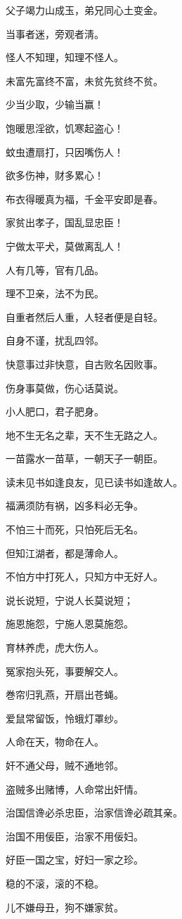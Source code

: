 \documentclass[12pt,oneside]{book}
\begin{document}
父子竭力山成玉，弟兄同心土变金。

当事者迷，旁观者淸。

怪人不知理，知理不怪人。

未富先富终不富，未贫先贫终不贫。

少当少取，少输当赢！

饱暖思淫欲，饥寒起盗心！

蚊虫遭扇打，只因嘴伤人！

欲多伤神，财多累心！

布衣得暖真为福，千金平安即是春。

家贫出孝子，国乱显忠臣！

宁做太平犬，莫做离乱人！

人有几等，官有几品。

理不卫亲，法不为民。

自重者然后人重，人轻者便是自轻。

自身不谨，扰乱四邻。

快意事过非快意，自古败名因败事。

伤身事莫做，伤心话莫说。

小人肥口，君子肥身。

地不生无名之辈，天不生无路之人。

一苗露水一苗草，一朝天子一朝臣。

读未见书如逢良友，见已读书如逢故人。

福满须防有祸，凶多料必无争。

不怕三十而死，只怕死后无名。

但知江湖者，都是薄命人。

不怕方中打死人，只知方中无好人。

说长说短，宁说人长莫说短；

施恩施怨，宁施人恩莫施怨。

育林养虎，虎大伤人。

冤家抱头死，事要解交人。

巻帘归乳燕，开扇出苍蝇。

爱鼠常留饭，怜蛾灯罩纱。

人命在天，物命在人。

奸不通父母，贼不通地邻。

盗贼多出赌博，人命常出奸情。

治国信谗必杀忠臣，治家信谗必疏其亲。

治国不用佞臣，治家不用佞妇。

好臣一国之宝，好妇一家之珍。

稳的不滚，滚的不稳。

儿不嫌母丑，狗不嫌家贫。
\end{document}
